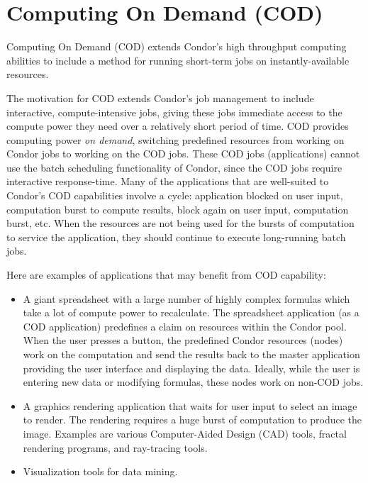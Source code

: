 \section{\label{sec:cod}Computing On Demand (COD)}

Computing On Demand (COD) extends Condor's high throughput
computing abilities to include
a method for running short-term jobs on instantly-available resources.

The motivation for COD extends Condor's job management to
include interactive, compute-intensive jobs,
giving these jobs immediate access to the
compute power they need over a relatively short period of time.
COD provides
computing power \emph{on demand}, 
switching predefined resources from working on Condor jobs
to working on the COD jobs. 
These COD jobs (applications) cannot use the batch
scheduling functionality of Condor, since the COD jobs require
interactive response-time.
Many of the applications that are well-suited to Condor's
COD capabilities involve a cycle:
application blocked on user input, computation burst to compute
results, block again on user input, computation burst, etc.
When the resources are not being used for the bursts of computation to
service the application, they should continue to execute
long-running batch jobs.

Here are examples of applications that may benefit from COD capability:

\begin{itemize}

\item A giant spreadsheet with a large number of highly complex
  formulas which take a lot of compute power to recalculate.
  The spreadsheet application (as a COD application) predefines
  a claim on resources within the Condor pool.
  When the user presses a \verb@recalculate@ button, 
  the predefined Condor resources (nodes) 
  work on the computation and send the results
  back to the master application providing the user interface and
  displaying the data.
  Ideally, while the user is entering new data or modifying formulas,
  these nodes work on non-COD jobs.

\item A graphics rendering application that waits for user
  input to select an image to render.
  The rendering requires a huge burst
  of computation to produce the image.
  Examples are various Computer-Aided Design (CAD) tools, fractal
  rendering programs, and ray-tracing tools.
 
\item Visualization tools for data mining.

\end{itemize}

